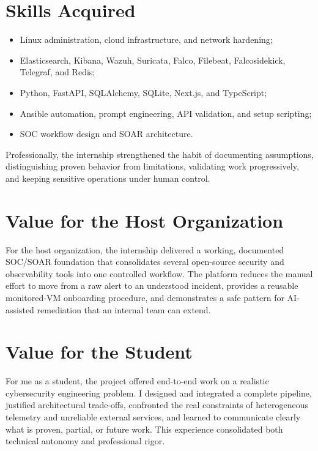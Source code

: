 \section*{Skills Acquired}

\begin{itemize}[leftmargin=1cm]
\item Linux administration, cloud infrastructure, and network hardening;
\item Elasticsearch, Kibana, Wazuh, Suricata, Falco, Filebeat, Falcosidekick, Telegraf, and Redis;
\item Python, FastAPI, SQLAlchemy, SQLite, Next.js, and TypeScript;
\item Ansible automation, prompt engineering, API validation, and setup scripting;
\item SOC workflow design and SOAR architecture.
\end{itemize}

Professionally, the internship strengthened the habit of documenting assumptions, distinguishing proven behavior from limitations, validating work progressively, and keeping sensitive operations under human control.

\section*{Value for the Host Organization}

For the host organization, the internship delivered a working, documented SOC/SOAR foundation that consolidates several open-source security and observability tools into one controlled workflow. The platform reduces the manual effort to move from a raw alert to an understood incident, provides a reusable monitored-VM onboarding procedure, and demonstrates a safe pattern for AI-assisted remediation that an internal team can extend.

\section*{Value for the Student}

For me as a student, the project offered end-to-end work on a realistic cybersecurity engineering problem. I designed and integrated a complete pipeline, justified architectural trade-offs, confronted the real constraints of heterogeneous telemetry and unreliable external services, and learned to communicate clearly what is proven, partial, or future work. This experience consolidated both technical autonomy and professional rigor.

